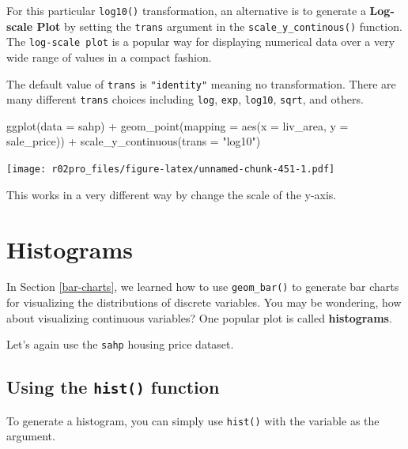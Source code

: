 \documentclass[
]{book}
\newenvironment{Shaded}{\begin{snugshade}}{\end{snugshade}}
\newcommand{\AttributeTok}[1]{\textcolor[rgb]{0.77,0.63,0.00}{#1}}
\newcommand{\FunctionTok}[1]{\textcolor[rgb]{0.00,0.00,0.00}{#1}}
\newcommand{\NormalTok}[1]{#1}
\newcommand{\SpecialCharTok}[1]{\textcolor[rgb]{0.00,0.00,0.00}{#1}}
\newcommand{\StringTok}[1]{\textcolor[rgb]{0.31,0.60,0.02}{#1}}
\begin{document}
For this particular \texttt{log10()} transformation, an alternative is to generate a \textbf{Log-scale Plot} by setting the \texttt{trans} argument in the \texttt{scale\_y\_continous()} function. The \texttt{log-scale\ plot} is a popular way for displaying numerical data over a very wide range of values in a compact fashion.

The default value of \texttt{trans} is \texttt{"identity"} meaning no transformation. There are many different \texttt{trans} choices including \texttt{log}, \texttt{exp}, \texttt{log10}, \texttt{sqrt}, and others.

\begin{Shaded}
\begin{Highlighting}[]
\FunctionTok{ggplot}\NormalTok{(}\AttributeTok{data =}\NormalTok{ sahp) }\SpecialCharTok{+} \FunctionTok{geom\_point}\NormalTok{(}\AttributeTok{mapping =} \FunctionTok{aes}\NormalTok{(}\AttributeTok{x =}\NormalTok{ liv\_area, }\AttributeTok{y =}\NormalTok{ sale\_price)) }\SpecialCharTok{+}
  \FunctionTok{scale\_y\_continuous}\NormalTok{(}\AttributeTok{trans =} \StringTok{"log10"}\NormalTok{)}
\end{Highlighting}
\end{Shaded}

\texttt{[image: r02pro\_files/figure-latex/unnamed-chunk-451-1.pdf]}

This works in a very different way by change the scale of the y-axis.

\hypertarget{histogram}{%
\section{Histograms}\label{histogram}}

In Section \ref{bar-charts}, we learned how to use \texttt{geom\_bar()} to generate bar charts for visualizing the distributions of discrete variables. You may be wondering, how about visualizing continuous variables? One popular plot is called \textbf{histograms}.

Let's again use the \texttt{sahp} housing price dataset.

\hypertarget{using-the-hist-function}{%
\subsection{\texorpdfstring{Using the \texttt{hist()} function}{Using the hist() function}}\label{using-the-hist-function}}

To generate a histogram, you can simply use \texttt{hist()} with the variable as the argument.
\end{document}
